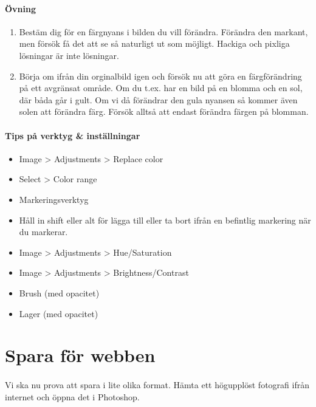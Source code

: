 \documentclass{article}
\begin{document}
    \paragraph{Övning}
      \begin{enumerate}
        \item Bestäm dig för en färgnyans i bilden du vill förändra. Förändra den markant, men försök få det att se så naturligt ut som möjligt. Hackiga och pixliga lösningar är inte lösningar.
        \item Börja om ifrån din orginalbild igen och försök nu att göra en färgförändring på ett avgränsat område. Om du t.ex. har en bild på en blomma och en sol, där båda går i gult. Om vi då förändrar den gula nyansen så kommer även solen att förändra färg. Försök alltså att endast förändra färgen på blomman.
      \end{enumerate} 

    \paragraph{Tips på verktyg \& inställningar}
      \begin{itemize}
        \item Image > Adjustments > Replace color
        \item Select > Color range
        \item Markeringsverktyg
        \item Håll in shift eller alt för lägga till eller ta bort ifrån en befintlig markering när du markerar.
        \item Image > Adjustments > Hue/Saturation
        \item Image > Adjustments > Brightness/Contrast
        \item Brush (med opacitet)
        \item Lager (med opacitet)
      \end{itemize}


  \section{Spara för webben}
    \paragraph{}
    Vi ska nu prova att spara i lite olika format. Hämta ett högupplöst fotografi ifrån internet och öppna det i Photoshop.
\end{document}
